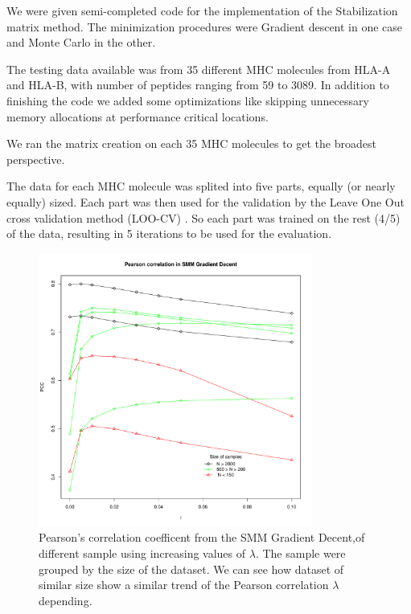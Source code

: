 \documentclass{bioinfo}
\begin{document}
\begin{application}
We were given semi-completed code for the implementation of the Stabilization matrix method. The minimization procedures were Gradient descent in one case and Monte Carlo in the other. 
\par The testing data available was from 35 different MHC molecules from HLA-A and HLA-B, with number of peptides ranging from 59 to 3089. In addition to finishing the code we added some optimizations like skipping unnecessary memory allocations at performance critical locations.
\par We ran the matrix creation on each 35 MHC molecules to get the broadest perspective.
\par The data for each MHC molecule was splited into five parts, equally (or nearly equally) sized. Each part was then used for the validation by the Leave One Out cross validation method (LOO-CV) \cite{wiki:crossval}. So each part was trained on the rest (4/5) of the data, resulting in 5 iterations to be used for the evaluation.
\begin{figure}[!tpb]
\centerline{\includegraphics[width=9cm]{fig/smm_l005_ppc_size.pdf}}
\caption{Pearson's correlation coefficent  from the SMM Gradient Decent,of different sample using increasing values of $\lambda$. The sample were grouped by the size of the dataset. We can see how dataset of similar size show a similar trend of the Pearson correlation $\lambda$ depending.}
\label{fig:01}
\end{figure}


\end{application}
\end{document}
